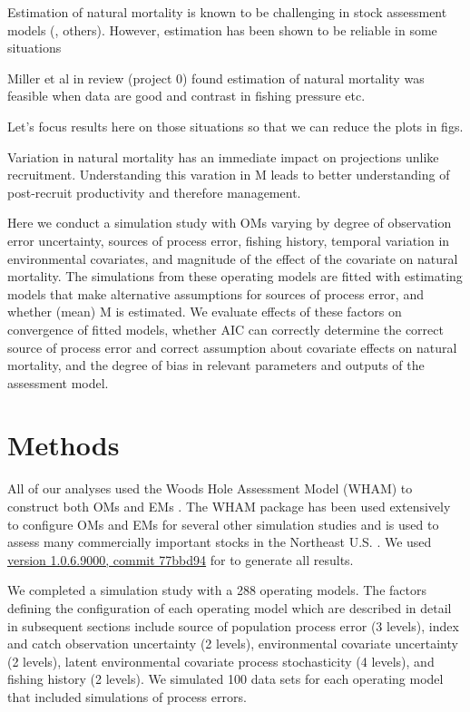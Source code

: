 \documentclass[
  12pt,
]{article}
\begin{document}
Estimation of natural mortality is known to be challenging in stock assessment models (\citet{leeetal11}, others). However, estimation has been shown to be reliable in some situations \citep{millerhyun18}

Miller et al in review (project 0) found estimation of natural mortality was feasible when data are good and contrast in fishing pressure etc.

Let's focus results here on those situations so that we can reduce the plots in figs.

Variation in natural mortality has an immediate impact on projections unlike recruitment. Understanding this varation in M leads to better understanding of post-recruit productivity and therefore management.

Here we conduct a simulation study with OMs varying by degree of observation error uncertainty, sources of process error, fishing history, temporal variation in environmental covariates, and magnitude of the effect of the covariate on natural mortality. The simulations from these operating models are fitted with estimating models that make alternative assumptions for sources of process error, and whether (mean) M is estimated. We evaluate effects of these factors on convergence of fitted models, whether AIC can correctly determine the correct source of process error and correct assumption about covariate effects on natural mortality, and the degree of bias in relevant parameters and outputs of the assessment model.

\hypertarget{methods}{%
\section*{Methods}\label{methods}}

All of our analyses used the Woods Hole Assessment Model (WHAM) to construct both OMs and EMs \citep{millerstock20, stockmiller21, milleretal_inreview}. The WHAM package has been used extensively to configure OMs and EMs for several other simulation studies \citep{legaultetal23, lietal24, brittenetal_inreview, lietal_inreview_a} and is used to assess many commercially important stocks in the Northeast U.S. \citep[e.g.,][]{nefsc22, nefsc22a, nefsc24}. We used \href{https://github.com/timjmiller/wham/tree/77bbd946e4881216a439933473d1c58b21c270c3}{version 1.0.6.9000, commit 77bbd94} for to generate all results.

We completed a simulation study with a 288 operating models. The factors defining the configuration of each operating model which are described in detail in subsequent sections include source of population process error (3 levels), index and catch observation uncertainty (2 levels), environmental covariate uncertainty (2 levels), latent environmental covariate process stochasticity (4 levels), and fishing history (2 levels). We simulated 100 data sets for each operating model that included simulations of process errors.
\end{document}
